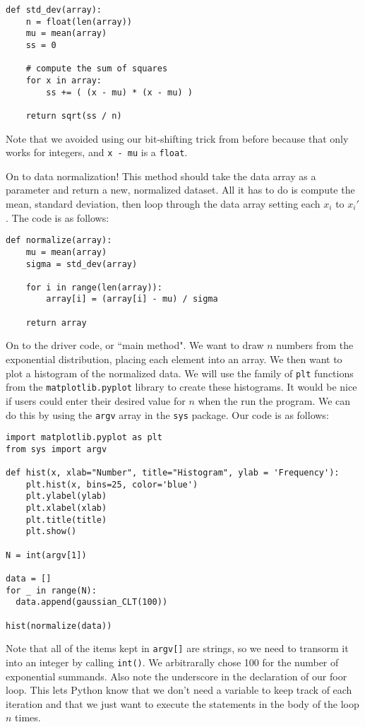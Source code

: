 \documentclass[a4paper]{article}
\begin{document}
\begin{verbatim}
def std_dev(array):
    n = float(len(array))
    mu = mean(array)
    ss = 0

    # compute the sum of squares
    for x in array:
        ss += ( (x - mu) * (x - mu) )

    return sqrt(ss / n)
\end{verbatim}

Note that we avoided using our bit-shifting trick from before because that only works for integers, and \texttt{x - mu} is a \texttt{float}.

On to data normalization! This method should take the data array as a parameter and return a new, normalized dataset. All it has to do is compute the mean, standard deviation, then loop through the data array setting each $x_i$ to $x_i'$. The code is as follows:

\begin{verbatim}
def normalize(array):
    mu = mean(array)
    sigma = std_dev(array)

    for i in range(len(array)):
        array[i] = (array[i] - mu) / sigma

    return array
\end{verbatim}

On to the driver code, or ``main method". We want to draw $n$ numbers from the exponential distribution, placing each element into an array. We then want to plot a histogram of the normalized data. We will use the family of \texttt{plt} functions from the \texttt{matplotlib.pyplot} library to create these histograms. It would be nice if users could enter their desired value for $n$ when the run the program. We can do this by using the \texttt{argv} array in the \texttt{sys} package. Our code is as follows:

\begin{verbatim}
import matplotlib.pyplot as plt
from sys import argv

def hist(x, xlab="Number", title="Histogram", ylab = 'Frequency'):
    plt.hist(x, bins=25, color='blue')
    plt.ylabel(ylab)
    plt.xlabel(xlab)
    plt.title(title)
    plt.show()

N = int(argv[1])

data = []
for _ in range(N):
  data.append(gaussian_CLT(100))

hist(normalize(data))
\end{verbatim}

Note that all of the items kept in \texttt{argv[]} are strings, so we need to transorm it into an integer by calling \texttt{int()}. We arbitrarally chose 100 for the number of exponential summands. Also note the underscore in the declaration of our foor loop. This lets Python know that we don't need a variable to keep track of each iteration and that we just want to execute the statements in the body of the loop $n$ times.
\end{document}
